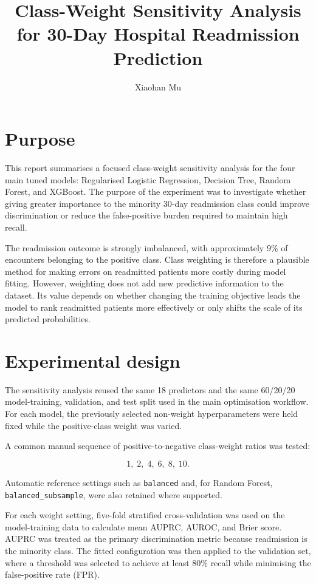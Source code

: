 \documentclass[11pt,a4paper]{article}
\title{Class-Weight Sensitivity Analysis for 30-Day Hospital Readmission Prediction}
\author{Xiaohan Mu}
\date{}
\begin{document}
\maketitle

\section{Purpose}

This report summarises a focused class-weight sensitivity analysis for the four main tuned models: Regularised Logistic Regression, Decision Tree, Random Forest, and XGBoost. The purpose of the experiment was to investigate whether giving greater importance to the minority 30-day readmission class could improve discrimination or reduce the false-positive burden required to maintain high recall.

The readmission outcome is strongly imbalanced, with approximately 9\% of encounters belonging to the positive class. Class weighting is therefore a plausible method for making errors on readmitted patients more costly during model fitting. However, weighting does not add new predictive information to the dataset. Its value depends on whether changing the training objective leads the model to rank readmitted patients more effectively or only shifts the scale of its predicted probabilities.

\section{Experimental design}

The sensitivity analysis reused the same 18 predictors and the same 60/20/20 model-training, validation, and test split used in the main optimisation workflow. For each model, the previously selected non-weight hyperparameters were held fixed while the positive-class weight was varied.

A common manual sequence of positive-to-negative class-weight ratios was tested:

\[
1,\;2,\;4,\;6,\;8,\;10.
\]

Automatic reference settings such as \texttt{balanced} and, for Random Forest, \texttt{balanced\_subsample}, were also retained where supported.

For each weight setting, five-fold stratified cross-validation was used on the model-training data to calculate mean AUPRC, AUROC, and Brier score. AUPRC was treated as the primary discrimination metric because readmission is the minority class. The fitted configuration was then applied to the validation set, where a threshold was selected to achieve at least 80\% recall while minimising the false-positive rate (FPR).
\end{document}

